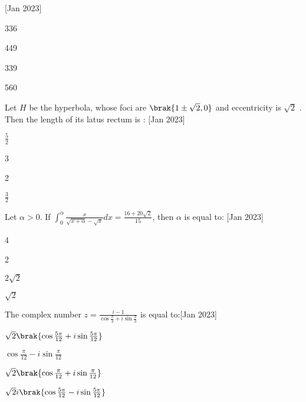  \hfill[Jan 2023]
 \begin{enumerate}
     \begin{multicols}{2}
         \item 336
         \item 449
         \item 339
         \item 560
     \end{multicols}
 \end{enumerate}
 \item Let $H$ be the hyperbola, whose foci are $\brak{1 \pm \sqrt{2}, 0}$
 and eccentricity is $\sqrt{2}$ 
. Then the length of its latus rectum is : \hfill[Jan 2023]
\begin{enumerate}
    \begin{multicols}{2}
        \item $\frac{5}{2}$
        \item 3
        \item 2
        \item $\frac{3}{2}$
    \end{multicols}
\end{enumerate}
\item Let $\alpha > 0$. If $\int_0^{\alpha} \frac{x}{\sqrt{x + \alpha} - \sqrt{x}}dx = \frac{16 + 20\sqrt{2}}{15}$, then $\alpha$ is equal to: \hfill[Jan 2023]
\begin{enumerate}
    \begin{multicols}{2}
        \item 4
        \item 2
        \item $2\sqrt{2}$
        \item $\sqrt{2}$
    \end{multicols}
\end{enumerate}
\item The complex number $z = \frac{i - 1}{\cos{\frac{\pi}{3}} + i\sin{\frac{\pi}{3}}}$ is equal to:\hfill[Jan 2023]
\begin{enumerate}
    \begin{multicols}{2}
        \item $\sqrt{2}\brak{\cos{\frac{5\pi}{12}} + i\sin{\frac{5\pi}{12}}}$
         \item $\cos{\frac{\pi}{12}} - i\sin{\frac{\pi}{12}}$
          \item $\sqrt{2}\brak{\cos{\frac{\pi}{12}} + i\sin{\frac{\pi}{12}}}$
           \item $\sqrt{2} i \brak{\cos{\frac{5\pi}{12}} - i\sin{\frac{5\pi}{12}}}$
    \end{multicols}
\end{enumerate}
